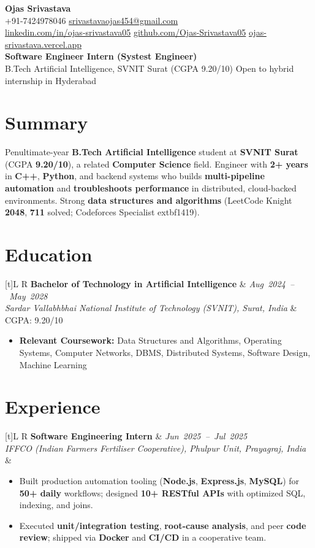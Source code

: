 \documentclass[a4paper,10pt]{article}
\newcommand{\resumeDate}[1]{\mbox{\small\textit{#1}}}
\newcommand{\resumeSubheading}[4]{
  \vspace{1mm}
  \noindent
  \begin{tabularx}{\textwidth}[t]{L R}
    \textbf{#1} & \resumeDate{#2} \\
    \small\textit{#3} & \small #4 \\
  \end{tabularx}
  \vspace{-0.5mm}
}
\newcommand{\resumeItemListStart}{\begin{itemize}[leftmargin=*, topsep=2pt, itemsep=1.5pt, parsep=0pt, partopsep=0pt]}
\newcommand{\resumeItemListEnd}{\end{itemize}\vspace{0.5mm}}
\begin{document}
\selectfont

\begin{center}
  {\LARGE \textbf{Ojas Srivastava}} \\[2mm]
  \small
  +91-7424978046 \textbar{}
  \href{mailto:srivastavaojas454@gmail.com}{srivastavaojas454@gmail.com} \\[1mm]
  \href{https://linkedin.com/in/ojas-srivastava05}{linkedin.com/in/ojas-srivastava05} \textbar{}
  \href{https://github.com/Ojas-Srivastava05}{github.com/Ojas-Srivastava05} \textbar{}
  \href{https://ojas-srivastava.vercel.app}{ojas-srivastava.vercel.app} \\[2mm]
  \textbf{Software Engineer Intern (Systest Engineer)} \\[0.5mm]
  B.Tech Artificial Intelligence, SVNIT Surat (CGPA 9.20/10) \textbar{} Open to hybrid internship in Hyderabad
\end{center}

\vspace{1mm}

\section{Summary}
\small
Penultimate-year \textbf{B.Tech Artificial Intelligence} student at \textbf{SVNIT Surat} (CGPA \textbf{9.20/10}), a related \textbf{Computer Science} field. Engineer with \textbf{2+ years} in \textbf{C++}, \textbf{Python}, and backend systems who builds \textbf{multi-pipeline automation} and \textbf{troubleshoots performance} in distributed, cloud-backed environments. Strong \textbf{data structures and algorithms} (LeetCode Knight \textbf{2048}, \textbf{711} solved; Codeforces Specialist 	extbf{1419}).

\section{Education}
\small
\resumeSubheading
  {Bachelor of Technology in Artificial Intelligence}{Aug 2024 -- May 2028}
  {Sardar Vallabhbhai National Institute of Technology (SVNIT), Surat, India}{CGPA: 9.20/10}
\resumeItemListStart
  \item \textbf{Relevant Coursework:} Data Structures and Algorithms, Operating Systems, Computer Networks, DBMS, Distributed Systems, Software Design, Machine Learning
\resumeItemListEnd

\section{Experience}
\small
\resumeSubheading
  {Software Engineering Intern}{Jun 2025 -- Jul 2025}
  {IFFCO (Indian Farmers Fertiliser Cooperative), Phulpur Unit, Prayagraj, India}{}
\resumeItemListStart
  \item Built production automation tooling (\textbf{Node.js}, \textbf{Express.js}, \textbf{MySQL}) for \textbf{50+ daily} workflows; designed \textbf{10+ RESTful APIs} with optimized SQL, indexing, and joins.
  \item Executed \textbf{unit/integration testing}, \textbf{root-cause analysis}, and peer \textbf{code review}; shipped via \textbf{Docker} and \textbf{CI/CD} in a cooperative team.
\resumeItemListEnd
\end{document}
